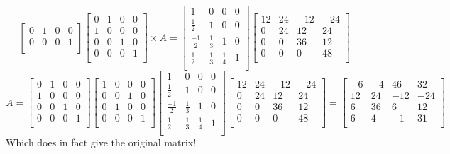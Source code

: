\begin{enumerate}[1)]
\begin{enumerate}[(a)]
\[\begin{bmatrix}
0 &1 & 0 & 0\\
0 & 0 & 0 & 1\\
	\end{bmatrix}
	\begin{bmatrix}
	0 & 1 & 0& 0\\
1 & 0 & 0 & 0\\
0 & 0 & 1 & 0\\
0 & 0 & 0 & 1\\
	\end{bmatrix}
	\times A
	=
	\begin{bmatrix}
	1 & 0 & 0 & 0\\
	\frac{1}{2} & 1 & 0 & 0\\
	\frac{-1}{2} & \frac{1}{3} & 1 & 0\\
	\frac{1}{2} & \frac{1}{3} & \frac{1}{4}& 1\\
 	\end{bmatrix}
	\begin{bmatrix}
12 & 24 & -12 & -24  \\
0 & 24 & 12 & 24 \\
0 & 0 & 36 & 12 \\
0 & 0 & 0 & 48  \\
\end{bmatrix}
	\]
	\[
	A=
	\begin{bmatrix}
	0 & 1 & 0 & 0 \\
	1 & 0 & 0 & 0  \\
	0 & 0 & 1 & 0\\
	0 & 0 & 0 & 1\\
 	\end{bmatrix}
	\begin{bmatrix}
	1 & 0 & 0 & 0  \\
	0 & 0 & 1 & 0\\
	0 & 1 & 0 & 0 \\
	0 & 0 & 0 & 1\\
 	\end{bmatrix}
	\begin{bmatrix}
	1 & 0 & 0 & 0\\
	\frac{1}{2} & 1 & 0 & 0\\
	\frac{-1}{2} & \frac{1}{3} & 1 & 0\\
	\frac{1}{2} & \frac{1}{3} & \frac{1}{4}& 1\\
 	\end{bmatrix}
	\begin{bmatrix}
12 & 24 & -12 & -24  \\
0 & 24 & 12 & 24 \\
0 & 0 & 36 & 12 \\
0 & 0 & 0 & 48  \\
\end{bmatrix}
=
\begin{bmatrix}
-6 & -4 & 46 & 32  \\
12 & 24 & -12 & -24 \\
6 & 36 & 6 & 12 \\
6 & 4 & -1 & 31 \\
\end{bmatrix}
	\]
	Which does in fact give the original matrix!
	\end{enumerate}


\end{enumerate}
